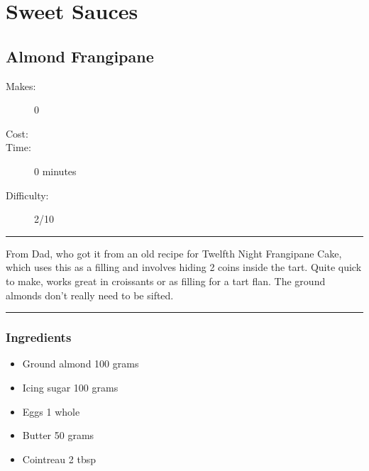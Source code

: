 \documentclass[]{article}
\begin{document}
\section*{\center\Huge\color{accent}Sweet Sauces}
\label{cat:Sweet Sauces}
\label{rec:Almond Frangipane}
\subsection*{\center\huge Almond Frangipane}
\begin{description}
\item[Makes:] 0 
\item[Cost:] \textdollar
\item[Time:] 0 minutes
\item[Difficulty:] 2/10
\end{description}
\vspace{0.2cm}\hrule\vspace{0.5cm}
\begin{adjustwidth}{0.5 cm}{0.5 cm}

From Dad, who got it from an old recipe for Twelfth Night Frangipane Cake, which uses this as a filling and involves hiding 2 coins inside the tart. Quite quick to make, works great in croissants or as filling for a tart flan. The ground almonds don't really need to be sifted. \hfill{}\color{black}

\end{adjustwidth}
\vspace{0.5cm}\hrule
\subsubsection*{\Large Ingredients}
\begin{multicols}{2}
\begin{itemize}
 \item Ground almond \hfill 100 grams
 \item Icing sugar \hfill 100 grams
 \item Eggs \hfill 1 whole
 \item Butter \hfill 50 grams
 \item Cointreau \hfill 2 tbsp
\end{itemize}
\end{multicols}
\end{document}
